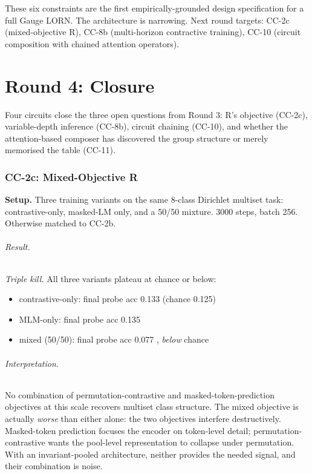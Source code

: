 \documentclass[10pt, twocolumn, a4paper]{article}
\begin{document}
These six constraints are the first empirically-grounded design specification for a full Gauge LORN. The architecture is narrowing. Next round targets: CC-2c (mixed-objective R), CC-8b (multi-horizon contractive training), CC-10 (circuit composition with chained attention operators).


\part*{Round 4: Closure}

Four circuits close the three open questions from Round 3: R's objective (CC-2c), variable-depth inference (CC-8b), circuit chaining (CC-10), and whether the attention-based composer has discovered the group structure or merely memorised the table (CC-11).

\section{CC-2c: Mixed-Objective R}

\textbf{Setup.} Three training variants on the same 8-class Dirichlet multiset task: contrastive-only, masked-LM only, and a 50/50 mixture. 3000 steps, batch 256. Otherwise matched to CC-2b.

\paragraph{Result.} \emph{Triple kill.} All three variants plateau at chance or below:
\begin{itemize}[nosep]
\item contrastive-only: final probe acc 0.133 (chance 0.125)
\item MLM-only: final probe acc 0.135
\item mixed (50/50): final probe acc 0.077 ,  \emph{below} chance
\end{itemize}

\paragraph{Interpretation.} No combination of permutation-contrastive and masked-token-prediction objectives at this scale recovers multiset class structure. The mixed objective is actually \emph{worse} than either alone: the two objectives interfere destructively. Masked-token prediction focuses the encoder on token-level detail; permutation-contrastive wants the pool-level representation to collapse under permutation. With an invariant-pooled architecture, neither provides the needed signal, and their combination is noise.
\end{document}
